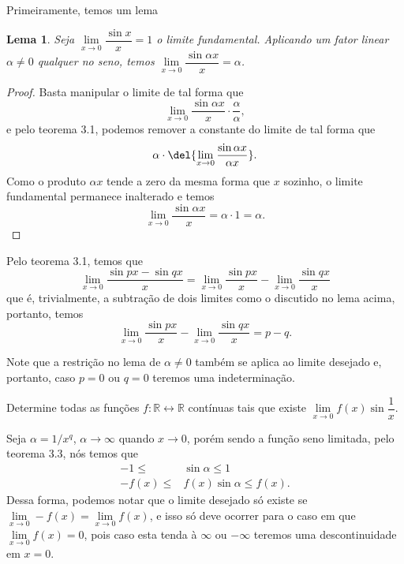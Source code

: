 \documentclass{IMTexam}
\newtheorem{lemma}[theorem]{Lema}
\begin{document}
\begin{questions}
		\begin{solution}
			Primeiramente, temos um lema
			
			\begin{lemma}
				Seja $ \lim\limits_{x\to0}\dfrac{\sin x}{x}=1 $ o limite fundamental. Aplicando um fator linear $ \alpha\neq 0 $ qualquer no seno, temos
				$ \lim\limits_{x\to0}\dfrac{\sin \alpha x}{x}=\alpha $.
			\end{lemma}
		
			\begin{proof}
				Basta manipular o limite de tal forma que
				\[ \lim\limits_{x\to0}\dfrac{\sin \alpha x}{x}\cdot\dfrac{\alpha}{\alpha}, \]
				e pelo teorema 3.1, podemos remover a constante do limite de tal forma que
				\[ \alpha\cdot\del{\lim\limits_{x\to0}\dfrac{\sin \alpha x}{\alpha x}}. \]
				Como o produto $ \alpha x $ tende a zero da mesma forma que $ x $ sozinho, o limite fundamental permanece inalterado e temos
				\[ \lim\limits_{x\to0}\dfrac{\sin \alpha x}{x}=\alpha\cdot1=\alpha. \]
			\end{proof}
			
			Pelo teorema 3.1, temos que
			\[ \lim\limits_{x\to0}\dfrac{\sin px-\sin qx}{x}=\lim\limits_{x\to0}\dfrac{\sin px}{x}-\lim\limits_{x\to0}\dfrac{\sin qx}{x} \]
			que é, trivialmente, a subtração de dois limites como o discutido no lema acima, portanto, temos
			\[ \lim\limits_{x\to0}\dfrac{\sin px}{x}-\lim\limits_{x\to0}\dfrac{\sin qx}{x}=p-q. \]
			
			Note que a restrição no lema de $ \alpha\neq0 $ também se aplica ao limite desejado e, portanto, caso $ p=0 $ ou $ q=0 $ teremos uma indeterminação.
		\end{solution}
	
		
		Determine todas as funções $ f\colon \mathbb{R}\longleftrightarrow\mathbb{R} $ contínuas tais que existe $ \lim\limits_{x\to0}f(x)\sin\dfrac{1}{x}. $
		
		\begin{solution}
			Seja $ \alpha = 1/x^{q} $, $\alpha\to\infty$ quando $ x\to0 $, porém sendo a função seno limitada, pelo teorema 3.3, nós temos que
			\begin{align*}
				-1\leqslant&\sin\alpha\leqslant1\\
				-f(x)\leqslant&f(x)\sin\alpha\leqslant f(x).
			\end{align*}
			Dessa forma, podemos notar que o limite desejado só existe se $ \lim\limits_{x\to0}-f(x)=\lim\limits_{x\to0}f(x) $, e isso só deve ocorrer para o caso em que $ \lim\limits_{x\to0}f(x)=0 $, pois caso esta tenda à $ \infty $ ou $ -\infty $ teremos uma descontinuidade em $ x=0 $.
		\end{solution}
		

\end{questions}
\end{document}
